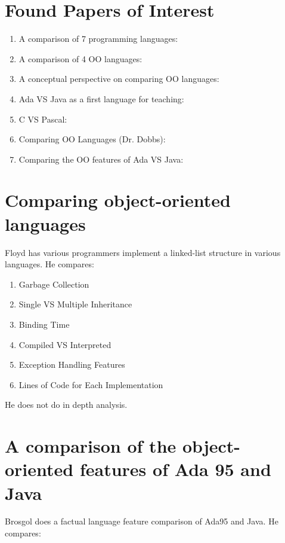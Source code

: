 \documentclass{article}
\begin{document}
\section{Found Papers of Interest}

\begin{enumerate}
    \item A comparison of 7 programming languages: \cite{Prechelt7LangComp}

\item A comparison of 4 OO languages: \cite{Henderson4OOLangComp}

\item A conceptual perspective on comparing OO languages: \cite{KristensenPerspCompOOLangs}

\item Ada VS Java as a first language for teaching: \cite{BrosgolAdaVsJavaTeaching}

\item C VS Pascal: \cite{FeuerCVsPascal}

\item Comparing OO Languages (Dr. Dobbs): \cite{DDJFloydeCompOOLangs}

\item Comparing the OO features of Ada VS Java: \cite{BrosgolCompOOAdaVsJava}

\end{enumerate}

\section{Comparing object-oriented languages}

Floyd has various programmers implement a linked-list structure in various languages.\cite{DDJFloydeCompOOLangs}  He compares:

\begin{enumerate}
    \item Garbage Collection
    \item Single VS Multiple Inheritance
    \item Binding Time
    \item Compiled VS Interpreted
    \item Exception Handling Features
    \item Lines of Code for Each Implementation
\end{enumerate}

He does not do in depth analysis.


\section{A comparison of the object-oriented features of Ada 95 and Java}
Brosgol does a factual language feature comparison of Ada95 and Java\cite{BrosgolCompOOAdaVsJava}.  He compares:
\end{document}
